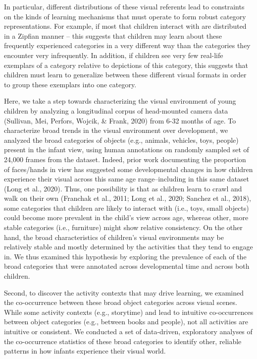\documentclass[10pt, letterpaper]{article}
\begin{document}
In particular, different distributions of these visual referents lead to
constraints on the kinds of learning mechanisms that must operate to
form robust category representations. For example, if most that children
interact with are distributed in a Zipfian manner -- this suggests that
children may learn about these frequently experienced categories in a
very different way than the categories they encounter very infrequently.
In addition, if children see very few real-life exemplars of a category
relative to depictions of this category, this suggests that children
must learn to generalize between these different visual formats in order
to group these exemplars into one category.

Here, we take a step towards characterizing the visual environment of
young children by analyzing a longitudinal corpus of head-mounted camera
data (Sullivan, Mei, Perfors, Wojcik, \& Frank, 2020) from 6-32 months
of age. To characterize broad trends in the visual environment over
development, we analyzed the broad categories of objects (e.g., animals,
vehicles, toys, people) present in the infant view, using human
annotations on randomly sampled set of 24,000 frames from the dataset.
Indeed, prior work documenting the proportion of faces/hands in view has
suggested some developmental changes in how children experience their
visual across this same age range--including in this same dataset (Long
et al., 2020). Thus, one possibility is that as children learn to crawl
and walk on their own (Franchak et al., 2011; Long et al., 2020; Sanchez
et al., 2018), some categories that children are likely to interact with
(i.e., toys, small objects) could become more prevalent in the child's
view across age, whereas other, more stable categories (i.e., furniture)
might show relative consistency. On the other hand, the broad
characteristics of children's visual environments may be relatively
stable and mostly determined by the activities that they tend to engage
in. We thus examined this hypothesis by exploring the prevalence of each
of the broad categories that were annotated across developmental time
and across both children.

Second, to discover the activity contexts that may drive learning, we
examined the co-occurrence between these broad object categories across
visual scenes. While some activity contexts (e.g., storytime) and lead
to intuitive co-occurrences between object categories (e.g., between
books and people), not all activities are intuitive or consistent. We
conducted a set of data-driven, exploratory analyses of the
co-occurrence statistics of these broad categories to identify other,
reliable patterns in how infants experience their visual world.
\end{document}
